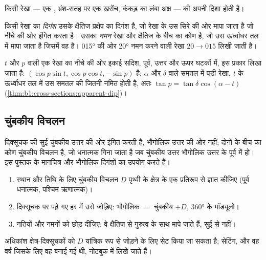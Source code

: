 किसी रेखा --- एक , भ्रंश-सतह पर एक खरोंच, कंकड़ का लंबा अक्ष --- की अपनी दिशा होती है।

\begin{definition}[दिगंश और नमन]\label{def:b1:field-lab-methods-1:trend-plunge}
किसी रेखा का \emph{दिगंश} उसके क्षैतिज प्रक्षेप का दिगंश है, जो रेखा के उस सिरे की ओर
मापा जाता है जो नीचे की ओर इंगित करता है। उसका \emph{नमन} रेखा और क्षैतिज के बीच का कोण है, जो उस
ऊर्ध्वाधर तल में मापा जाता है जिसमें वह है। \ang{015} की ओर \ang{20} नमन करने वाली रेखा $20\to015$ लिखी जाती है।
\end{definition}

 $t$ और  $p$ वाली एक रेखा का नीचे की ओर इकाई सदिश, पूर्व, उत्तर और ऊपर घटकों में, इस प्रकार लिखा जाता है:
$(\cos p\sin t, \cos p\cos t, -\sin p)$ है;  $\alpha$ और  $\delta$ वाले समतल में पड़ी रेखा,  $t$ के
ऊर्ध्वाधर तल में उस समतल की  जितनी नमित होती है, अतः $\tan p = \tan\delta\cos(\alpha - t)$
(\cref{thm:b1:cross-sections:apparent-dip})।

\subsection{चुंबकीय विचलन}

दिक्सूचक की सुई चुंबकीय उत्तर की ओर इंगित करती है, भौगोलिक उत्तर की ओर नहीं; दोनों के बीच का कोण चुंबकीय
विचलन है, जो धनात्मक गिना जाता है जब चुंबकीय उत्तर भौगोलिक उत्तर के पूर्व में हो। इस पुस्तक के मानचित्र और
 भौगोलिक दिगंशों का उपयोग करते हैं।

\begin{method}[दिक्सूचक दिगंश का सुधार]\label{met:b1:field-lab-methods-1:declination}
\begin{enumerate}
  \item स्थान और तिथि के लिए चुंबकीय विचलन $D$ पृथ्वी के क्षेत्र के एक प्रतिरूप से ज्ञात कीजिए (पूर्व धनात्मक, पश्चिम ऋणात्मक)।
  \item दिक्सूचक पर पढ़े गए हर  में उसे जोड़िए: भौगोलिक  $=$ चुंबकीय  $+ D$, \ang{360} के मॉड्यूलो।
  \item नतियों और नमनों को छोड़ दीजिए: वे क्षैतिज से गुरुत्व के साथ मापे जाते हैं, सुई से नहीं।
\end{enumerate}
अधिकांश क्षेत्र-दिक्सूचकों को $D$ यांत्रिक रूप से जोड़ने के लिए सेट किया जा सकता है; सेटिंग, और वह वर्ष जिसके लिए
वह बनाई गई थी, नोटबुक में लिखे जाते हैं।
\end{method}

